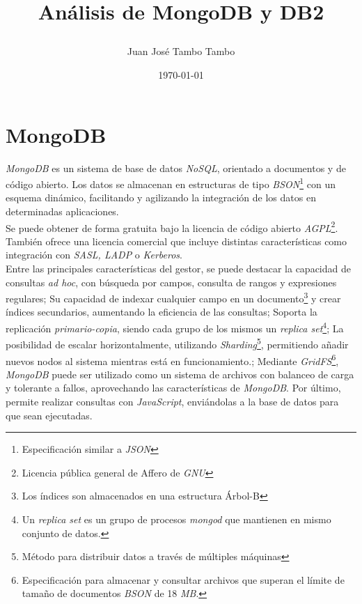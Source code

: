\documentclass[11pt,a4paper]{article}
\begin{document}
	
\begin{titlepage}
\title{
\begin{Huge}
\textbf{Análisis de MongoDB y DB2}
\end{Huge}
}

\author{Juan José Tambo Tambo}
\date{\today}

\end{titlepage}

\newpage

\section{MongoDB}

\emph{MongoDB} es un sistema de base de datos \emph{NoSQL}, orientado a documentos y de código abierto. Los datos se almacenan en estructuras de tipo \emph{BSON}\footnote{Especificación similar a \emph{JSON}} con un esquema dinámico, facilitando y agilizando la integración de los datos en determinadas aplicaciones.\\
Se puede obtener de forma gratuita bajo la licencia de código abierto  \emph{AGPL}\footnote{Licencia pública general de Affero de \emph{GNU}}. También ofrece una licencia comercial que incluye distintas características como integración con \emph{SASL, LADP} o \emph{Kerberos}.\cite{WIKI:13}\\

Entre las principales características del gestor\cite{WIKI:14}, se puede destacar la capacidad de consultas \emph{ad hoc}, con búsqueda por campos, consulta de rangos y expresiones regulares; Su capacidad de indexar cualquier campo en un documento\footnote{Los índices son almacenados en una estructura Árbol-B} y crear índices secundarios, aumentando la eficiencia de las consultas\cite{MDB:1}; Soporta la replicación \emph{primario-copia}, siendo cada grupo de los mismos un \emph{replica set}\footnote{Un \emph{replica set} es un grupo de procesos \emph{mongod} que mantienen en mismo conjunto de datos.\cite{MDB:2}}; La posibilidad de escalar horizontalmente, utilizando \emph{Sharding}\footnote{Método para distribuir datos a través de múltiples máquinas}, permitiendo añadir nuevos nodos al sistema mientras está en funcionamiento.\cite{MDB:3};  Mediante \emph{GridFS}\footnote{Especificación para almacenar y consultar archivos que superan el límite de tamaño de documentos \emph{BSON} de 18 \emph{MB}.\cite{MDB:4}}, \emph{MongoDB} puede ser utilizado como un sistema de archivos con balanceo de carga y tolerante a fallos, aprovechando las características de \emph{MongoDB}. Por último, permite realizar consultas con \emph{JavaScript}\cite{MDB:5}, enviándolas a la base de datos para que sean ejecutadas.\\
\end{document}
